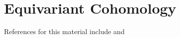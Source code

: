 %
\section{Equivariant Cohomology}
%
References for this material include \cite{TuEC} and \cite{Kirwan}
%